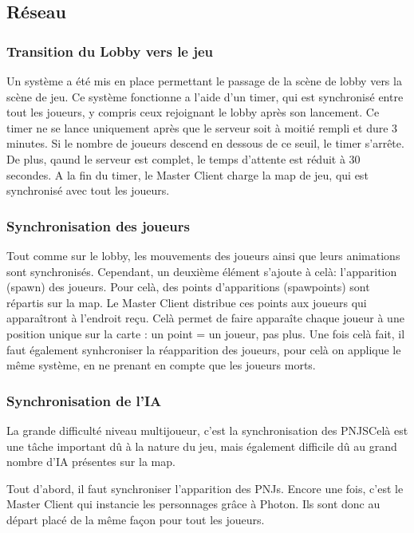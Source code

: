 \subsection{Réseau}

    \subsubsection{Transition du Lobby vers le jeu}
        Un système a été mis en place permettant le passage de la scène de lobby vers la scène de jeu.
        Ce système fonctionne a l'aide d'un timer, qui est synchronisé entre tout les joueurs, y compris ceux
        rejoignant le lobby après son lancement. Ce timer ne se lance uniquement après que le serveur soit à moitié
        rempli et dure 3 minutes. Si le nombre de joueurs descend en dessous de ce seuil, le timer s'arrête. De plus, qaund le serveur
        est complet, le temps d'attente est réduit à 30 secondes.
        A la fin du timer, le Master Client charge la map de jeu, qui est synchronisé avec tout les joueurs.
    
    \subsubsection{Synchronisation des joueurs}
        Tout comme sur le lobby, les mouvements des joueurs ainsi que leurs animations sont synchronisés. Cependant,
        un deuxième élément s'ajoute à celà: l'apparition (spawn) des joueurs. Pour celà, des points d'apparitions (spawpoints)
        sont répartis sur la map. Le Master Client distribue ces points aux joueurs qui apparaîtront à l'endroit reçu. Celà permet
        de faire apparaîte chaque joueur à une position unique sur la carte : un point = un joueur, pas plus. Une fois celà fait,
        il faut également synhcroniser la réapparition des joueurs, pour celà on applique le même système, en ne prenant en compte que les joueurs
        morts.

    \subsubsection{Synchronisation de l'IA}
        La grande difficulté niveau multijoueur, c'est la synchronisation des PNJSCelà est une tâche important dû à la nature du jeu, 
        mais également difficile dû au grand nombre d'IA présentes sur la map.

        Tout d'abord, il faut synchroniser l'apparition des PNJs. Encore une fois, c'est le Master Client qui instancie les personnages
        grâce à Photon. Ils sont donc au départ placé de la même façon pour tout les joueurs.

